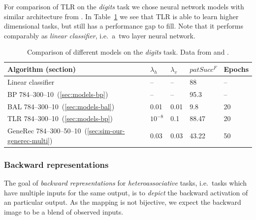 For comparison of TLR on the \emph{digits} task we chose neural network models with similar architecture from \citet{digits2014mnist}. In Table~\ref{tab:results-cmp-digits} we see that TLR is able to learn higher dimensional tasks, but still has a performance gap to fill. Note that it performs comparably as \emph{linear classifier}, i.e.~a~two layer neural network. 

\begin{table}[H] 
  \centering
    \begin{tabular}{|l|l|l|l|l|}
    \hline
    Algorithm (section)&$\lambda_h$&$\lambda_v$&$patSucc^F$ &Epochs\\ %
    \hline
    Linear classifier & -- & -- & 88 & -- \\ 
    \hline
    BP 784--300--10~(\ref{sec:models-bp})& -- & -- & 95.3 & -- \\ 
    \hline 
    BAL 784--300--10~(\ref{sec:models-bal})& 0.01 & 0.01 & 9.8 & 20 \\
    \hline 
    TLR 784--300--10~(\ref{sec:models-bp})& $10^{-8}$ & 0.1 & 88.47 & 20 \\
    \hline 
    GeneRec 784--300--50--10~(\ref{sec:sim-our-generec-multi})& 0.03 & 0.03 & 43.22 & 50 \\
    \hline 
    \end{tabular}
  \caption{Comparison of different models on the \emph{digits} task. Data from \citet{lecun1998gradient} and \citet{digits2014mnist}.} 
  \label{tab:results-cmp-digits}
\end{table}

\subsubsection{Backward representations} 
\label{sec:our-backward-repre}

The goal of \emph{backward representations} for \emph{heteroassociative} tasks, i.e.~tasks which have multiple inputs for the same output, is to \emph{depict} the backward activation of an particular output. As the mapping is not bijective, we expect the backward image to be a blend of observed inputs. %

